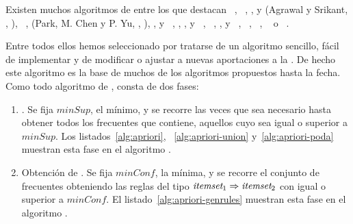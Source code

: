 Existen muchos algoritmos de \arm entre los que destacan 
~\citep{AgrawalImielinskiSwami-MiningAssociationRulesBetweenSetsOfItemsInLargeDB-1993}, 
~\citep{HoutsmaSwami-SETMofAR-1993}, 
,  y  (Agrawal y Srikant, \cite*{AgrawalSrikant-FastAlgorithmsForMiningAssociationRules-1994}, \cite*{AgrawalSrikant-FastAlgorithmsForMiningAssociationRules-LARGO-1994}), 
~\citep{SavasereOmiecinskiNavathe-AnEfficientAlgorithmForARM-1995}, 
 (Park, M. Chen y P. Yu, \cite*{ParkChenYu-AnEffectiveHashBasedAlgorithmForARM-1995}, \cite*{ParkChenYu-UsingAHashBasedMethod-1997}), 
,  y ~\citep{AgrawalShafer-ParallelMAR-1996}, 
, ,  y ~\citep{ZakiParthasarathyOgiharaL-NewAlgorithms-1997}, 
~\citep{BrinMotwaniUllmanTsur-DynamicItemsetCounting-1997}, 
,  y ~\citep{SrikantAgrawal-MiningGeneralizedAR-1997}, 
~\citep{Bayardo-EfficientlyMiningLongPatternsFromDB-1998}, 
~\citep{GrothRoberston-DiscoveringFrequentItemsets-2001}, 
~\citep{LinKedem-PincerSearchFIM-2002} o 
~\citep{HanPeiYin-MiningFrequentPatternsWithoutCandidateGeneration-2000,HanPeiYinMao-MiningFrequentPatternsWithoutCandidateGenerationAFPTreeApproach-2004}.


Entre todos ellos hemos seleccionado \apriori por tratarse de un algoritmo sencillo, fácil de implementar y de modificar o ajustar a nuevas aportaciones a la \arm. De hecho este algoritmo es la base de muchos de los algoritmos propuestos hasta la fecha. Como todo algoritmo de \ARM, \apriori consta de dos fases:
\begin{enumerate}
   \item \fim. Se fija $minSup$, el \soporte mínimo, y se recorre \D las veces que sea necesario hasta obtener todos los \itemsets frecuentes que contiene, aquellos cuyo \soporte sea igual o superior a $minSup$. Los listados~\ref{alg:apriori}, ~\ref{alg:apriori-union} y~\ref{alg:apriori-poda} muestran esta fase en el algoritmo \apriori.
   \item Obtención de \ARs. Se fija $minConf$, la \confianza mínima, y se recorre el conjunto de \itemsets frecuentes \aprioriL obteniendo las reglas del tipo $\itemset_1 \Rightarrow \itemset_2$ con \confianza igual o superior a $minConf$. El listado~\ref{alg:apriori-genrules} muestran esta fase en el algoritmo \apriori.
\end{enumerate}


